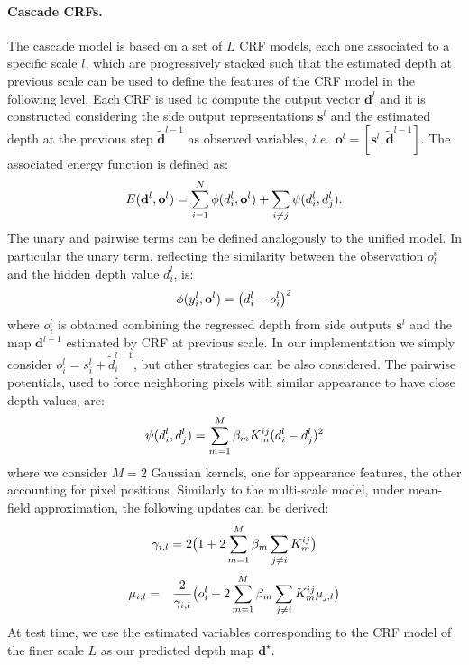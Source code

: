 \documentclass[10pt,twocolumn,letterpaper]{article}
\newcommand{\vect}[1]{\mathbf{#1}}
\def\ie{\textit{i.e.}~}
\begin{document}
\paragraph{Cascade CRFs.}
The cascade model is based on a set of $L$ CRF models, each one associated to a specific scale $l$, which are
progressively stacked such that the estimated depth at previous scale can be used to define the features of the CRF model
in the following level.
Each CRF is used to compute the output vector $\vect{d}^l$ and it is 
constructed considering the side output representations $\vect{s}^l$ and the estimated depth at the previous
step $\tilde{\vect{d}}^{l-1}$ as observed variables, \ie $\vect{o}^l=[\vect{s}^l, \tilde{\vect{d}}^{l-1}]$.
The associated energy function is defined as:
\begin{equation}
\setlength{\abovedisplayskip}{2pt}
\setlength{\belowdisplayskip}{2pt}
E(\vect{d}^l, \vect{o}^l) = \sum_{i=1}^{N} \phi(d_i^l, \vect{o}^l) + \sum_{i \neq j} \psi(d_i^l, d_j^l).
\end{equation}
The unary and pairwise terms can be defined analogously to the unified model.
In particular the unary term, reflecting the similarity between the observation $o^i_l$ and the hidden depth value $d_i^l$, is:
\begin{equation}
\setlength{\abovedisplayskip}{2pt}
\setlength{\belowdisplayskip}{2pt}
\phi(y_i^l, \vect{o}^l) = \big (d_i^l - o_i^l \big )^2
\end{equation}
where $o_i^l$ is obtained combining the regressed depth from side outputs $\vect{s}^l$ and 
the map $\vect{d}^{l-1}$ estimated by CRF at previous scale. In our implementation we simply consider $o_i^l=s_i^l+\tilde{d}_i^{l-1}$, but other
strategies can be also considered.
The pairwise potentials, used to force neighboring pixels with similar appearance to have 
close depth values, are:
\begin{equation}
\setlength{\abovedisplayskip}{2pt}
\setlength{\belowdisplayskip}{2pt}
\psi(d_i^l, d_j^l) = \sum_{m=1}^{M}\beta_m K_m^{ij}(d_i^l-d_j^l)^2
\end{equation}
where we consider $M=2$ Gaussian kernels, one for appearance features, the other accounting for pixel positions.
Similarly to the multi-scale model, under mean-field approximation, the following updates can be derived:
\begin{equation}
\setlength{\abovedisplayskip}{2pt}
\setlength{\belowdisplayskip}{2pt}
\gamma_{i,l} = 2 \big(1+2 \sum_{m=1}^{M} \beta_m \sum_{j\neq i}  K_m^{ij}\big)
\label{gamma1}
\end{equation}
\begin{equation}
\begin{aligned}
\setlength{\abovedisplayskip}{2pt}
\setlength{\belowdisplayskip}{2pt}
&\mu_{i,l} =& \frac{2}{\gamma_{i,l}} \big(o_i^l + 2\sum_{m=1}^{M}\beta_m \sum_{j \neq i} K_m^{ij} \mu_{j,l}  \big)
\label{mu1}
\end{aligned}
\end{equation}
At test time, we use the estimated variables corresponding to the CRF model
of the finer scale $L$ as our predicted depth map $\mathbf{d}^\star$.
\end{document}
